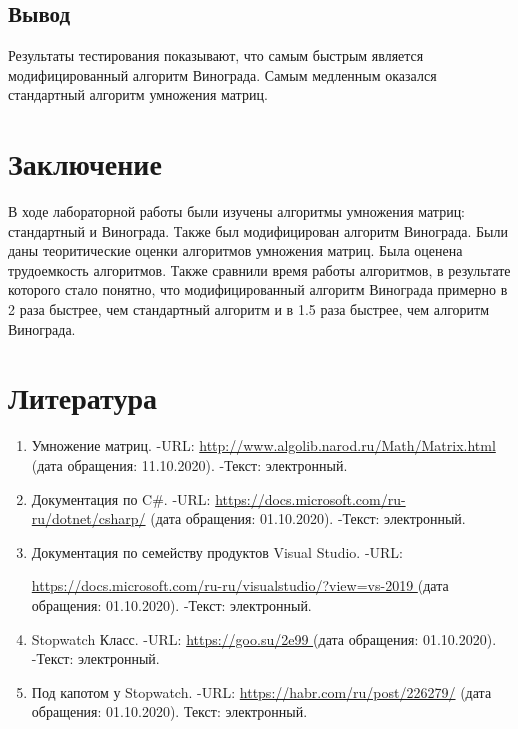 \documentclass[12pt]{report}
\begin{document}
	\section{Вывод}
	Результаты тестирования показывают, что самым быстрым является модифицированный алгоритм Винограда. Самым медленным оказался стандартный алгоритм умножения матриц.

	\chapter*{Заключение}
	В ходе лабораторной работы были изучены алгоритмы умножения матриц: стандартный и Винограда. Также был модифицирован алгоритм Винограда. Были даны теоритические оценки алгоритмов умножения матриц. Была оценена трудоемкость алгоритмов. Также сравнили время работы алгоритмов, в результате которого стало понятно, что модифицированный алгоритм Винограда примерно в 2 раза быстрее, чем стандартный алгоритм и в 1.5 раза быстрее, чем алгоритм Винограда.

	\chapter*{Литература}
	\begin{enumerate}
		\label{literature}
		\item Умножение матриц. -URL: \href{http://www.algolib.narod.ru/Math/Matrix.html}{http://www.algolib.narod.ru/Math/Matrix.html} (дата обращения: 11.10.2020). -Текст: электронный.
		\item  Документация по C\#. -URL: \href{https://docs.microsoft.com/ru-ru/dotnet/csharp/}{https://docs.microsoft.com/ru-ru/dotnet/csharp/} (дата обращения: 01.10.2020). -Текст: электронный.
		\item Документация по семейству продуктов Visual Studio. -URL:\par \href{https://docs.microsoft.com/ru-ru/visualstudio/?view=vs-2019}{https://docs.microsoft.com/ru-ru/visualstudio/?view=vs-2019 } (дата обращения: 01.10.2020). -Текст: электронный.
		\item Stopwatch Класс. -URL: \href{https://goo.su/2e99}{https://goo.su/2e99 } (дата обращения: 01.10.2020). -Текст: электронный.
		\item Под капотом у Stopwatch. -URL:  \href{https://habr.com/ru/post/226279/}{https://habr.com/ru/post/226279/} (дата обращения: 01.10.2020). Текст: электронный.
	\end{enumerate}
\end{document}
